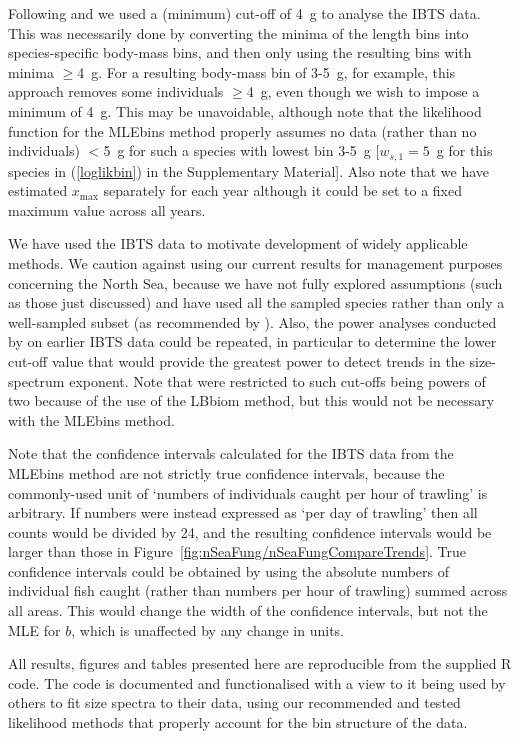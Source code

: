 \documentclass[12pt, letter]{article}
\newcommand{\xmax}{x_{\mathrm{max}}}
\begin{document}
Following \citet{pj05} and \citet{blan05} we used a (minimum) cut-off of 4~g to
analyse the IBTS data. This was necessarily done by converting the minima of the
length bins into species-specific body-mass bins, and then only using the
resulting bins with minima $\geq$4~g.  For a resulting body-mass bin of
3-5~g, for example, this approach removes some individuals $\geq$4~g, even though we wish to
impose a minimum of 4~g. This may be unavoidable, although note that the
likelihood function for the MLEbins method properly assumes no data (rather than no
individuals) $<$5~g for such a species with lowest bin 3-5~g [$w_{s,1} = 5$~g
for this species in (\ref{loglikbin}) in the Supplementary Material].
Also note that we have estimated $\xmax$ separately for each year although it
could be set to a fixed maximum value across all years.

We have used the IBTS data to motivate development of widely applicable
methods. We caution against using our current results for management purposes
concerning the North Sea, because we have not fully explored assumptions (such
as those just discussed) and have used all the sampled species rather than only
a well-sampled subset (as recommended by \citealt{jd05}). Also, the power
analyses conducted by \citet{jd05} on earlier IBTS data could be repeated, in
particular to determine the lower cut-off value that would provide the greatest
power to detect trends in the size-spectrum exponent. Note that \citet{jd05}
were restricted to such cut-offs being powers of two because of the use of the
LBbiom method, but this would not be necessary with the MLEbins method.


Note that the confidence intervals calculated for the IBTS data
from the MLEbins method
are not strictly true confidence intervals, because the commonly-used unit of `numbers
of individuals caught per hour of trawling' is arbitrary. If numbers were
instead expressed as `per day of trawling' then all counts would be divided by
24, and
the resulting confidence intervals would be larger than those in
Figure~\ref{fig:nSeaFung/nSeaFungCompareTrends}.
True confidence intervals could be obtained by using the absolute numbers of
individual fish caught (rather than numbers per hour of
trawling) summed across all areas.
This would change the width of the confidence intervals, but not the MLE for
$b$, which is unaffected by any change in units.

All results, figures and tables presented here are reproducible from the
supplied R code. The code is documented and functionalised with a view to it
being used by others to fit size spectra to their data, using our recommended
and tested likelihood methods that properly account for the bin structure of the data.
\end{document}
